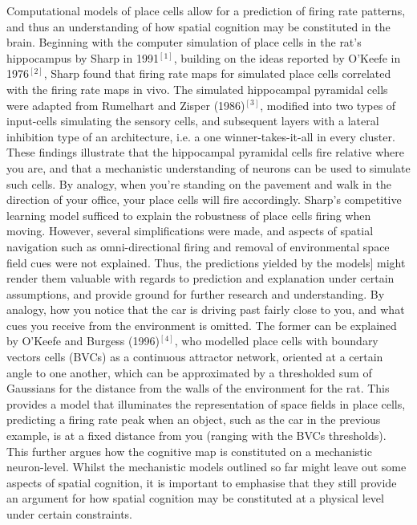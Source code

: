 Computational models of place cells allow for a prediction of firing rate patterns, and thus an understanding of how spatial cognition may be constituted in the brain. Beginning with the computer simulation of place cells in the rat’s hippocampus by Sharp in 1991$^{[1]}$, building on the ideas reported by O’Keefe in 1976$^{[2]}$, Sharp found that firing rate maps for simulated place cells correlated with the firing rate maps in vivo. The simulated hippocampal pyramidal cells were adapted from Rumelhart and Zisper (1986)$^{[3]}$, modified into two types of input-cells simulating the sensory cells, and subsequent layers with a lateral inhibition type of an architecture, i.e. a one winner-takes-it-all in every cluster. These findings illustrate that the hippocampal pyramidal cells fire relative where you are, and that a mechanistic understanding of neurons can be used to simulate such cells. By analogy, when you’re standing on the pavement and walk in the direction of your office, your place cells will fire accordingly. Sharp’s competitive learning model sufficed to explain the robustness of place cells firing when moving. However, several simplifications were made, and aspects of spatial navigation such as omni-directional firing and removal of environmental space field cues were not explained. Thus, the predictions yielded by the models] might render them valuable with regards to prediction and explanation under certain assumptions, and provide ground for further research and understanding. By analogy, how you notice that the car is driving past fairly close to you, and what cues you receive from the environment is omitted. The former can be explained by O’Keefe and Burgess (1996)$^{[4]}$, who modelled place cells with boundary vectors cells (BVCs) as a continuous attractor network, oriented at a certain angle to one another, which can be approximated by a thresholded sum of Gaussians for the distance from the walls of the environment for the rat. This provides a model that illuminates the representation of space fields in place cells, predicting a firing rate peak when an object, such as the car in the previous example, is at a fixed distance from you (ranging with the BVCs thresholds). This further argues how the cognitive map is constituted on a mechanistic neuron-level. Whilst the mechanistic models outlined so far might leave out some aspects of spatial cognition, it is important to emphasise that they still provide an argument for how spatial cognition may be constituted at a physical level under certain constraints. 

